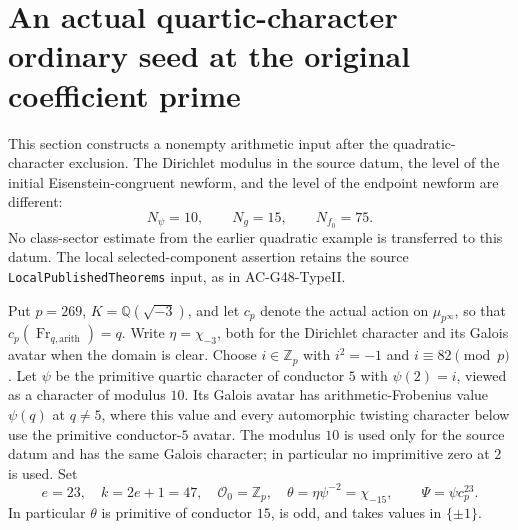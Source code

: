 \section{An actual quartic-character ordinary seed at the original coefficient prime}
\label{sec:cubic-quartic-actual-seed}

This section constructs a nonempty arithmetic input after the quadratic-character
exclusion.  The Dirichlet modulus in the source datum, the level of the initial
Eisenstein-congruent newform, and the level of the endpoint newform are different:
\[
                 N_\psi=10,\qquad N_g=15,\qquad N_{f_0}=75.
                                                        \tag{G118.1}
\]
No class-sector estimate from the earlier quadratic example is transferred to
this datum.  The local selected-component assertion retains the source
\texttt{LocalPublishedTheorems} input, as in AC-G48-TypeII.

Put $p=269$, $K=\mathbb Q(\sqrt{-3})$, and let $c_p$ denote the actual
action on $\mu_{p^\infty}$, so that $c_p(\operatorname{Fr}_{q,\mathrm{arith}})=q$.
Write $\eta=\chi_{-3}$, both for the Dirichlet character and its Galois avatar
when the domain is clear.  Choose $i\in\mathbb Z_p$ with $i^2=-1$ and
$i\equiv82\pmod p$.  Let $\psi$ be the primitive quartic character of conductor
$5$ with $\psi(2)=i$, viewed as a character of modulus $10$.  Its Galois avatar
has arithmetic-Frobenius value $\psi(q)$ at $q\ne5$, where this value and every
automorphic twisting character below use the primitive conductor-$5$ avatar.
The modulus $10$ is used only for the source datum and has the same Galois
character; in particular no imprimitive zero at $2$ is used.  Set
\[
 e=23,\quad k=2e+1=47,\quad \mathcal O_0=\mathbb Z_p,\quad
 \theta=\eta\psi^{-2}=\chi_{-15},\qquad \Psi=\psi c_p^{23}.
                                                        \tag{G118.2}
\]
In particular $\theta$ is primitive of conductor $15$, is odd, and takes
values in $\{\pm1\}$.

